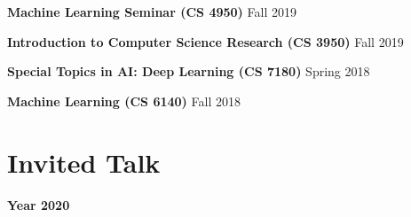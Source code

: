 \documentclass[margin,line]{res}
\begin{document}
\begin{resume}
 {\bf Machine Learning Seminar (CS 4950)}   \hfill  { Fall 2019} 

 {\bf Introduction to Computer Science Research (CS 3950)}   \hfill  { Fall 2019} 
 
 {\bf Special Topics in AI: Deep Learning (CS 7180)}   \hfill  { Spring 2018} 


 {\bf Machine Learning (CS 6140)}   \hfill  { Fall 2018 } 


% 
 
% 
% 








\section{\sc Invited Talk}

 {\bf Year  2020}
 


\end{resume}
\end{document}
